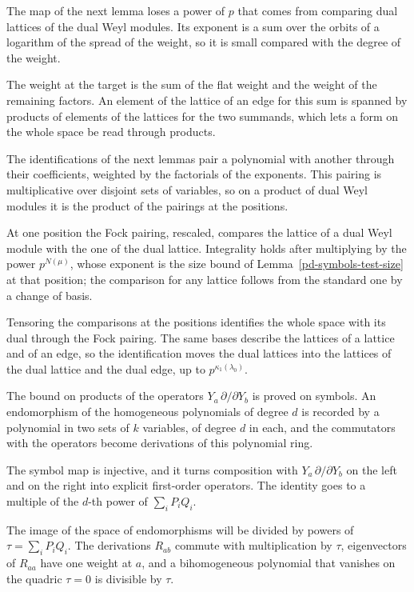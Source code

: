 The map of the next lemma loses a power of $p$ that comes from comparing dual lattices of the dual Weyl
modules. Its exponent is a sum over the orbits of a logarithm of the spread of the weight, so it is
small compared with the degree of the weight.

The weight at the target is the sum of the flat weight and the weight of the remaining factors. An element
of the lattice of an edge for this sum is spanned by products of elements of the lattices for the two
summands, which lets a form on the whole space be read through products.

The identifications of the next lemmas pair a polynomial with another through their coefficients, weighted
by the factorials of the exponents. This pairing is multiplicative over disjoint sets of variables, so on a
product of dual Weyl modules it is the product of the pairings at the positions.

At one position the Fock pairing, rescaled, compares the lattice of a dual Weyl module with the one of the
dual lattice. Integrality holds after multiplying by the power $p^{N(\mu)}$, whose exponent is the size bound
of Lemma~\ref{pd-symbols-test-size} at that position; the comparison for any lattice follows from the
standard one by a change of basis.

Tensoring the comparisons at the positions identifies the whole space with its dual through the Fock
pairing. The same bases describe the lattices of a lattice and of an edge, so the identification moves the
dual lattices into the lattices of the dual lattice and the dual edge, up to $p^{\kappa_1(\lambda_0)}$.

The bound on products of the operators $Y_a\,\partial/\partial Y_b$ is proved on symbols. An endomorphism of the
homogeneous polynomials of degree $d$ is recorded by a polynomial in two sets of $k$ variables, of degree $d$ in each,
and the commutators with the operators become derivations of this polynomial ring.

The symbol map is injective, and it turns composition with $Y_a\,\partial/\partial Y_b$ on the left and on the right into
explicit first-order operators. The identity goes to a multiple of the $d$-th power of $\sum_iP_iQ_i$.

The image of the space of endomorphisms will be divided by powers of $\tau=\sum_iP_iQ_i$. The derivations $R_{ab}$
commute with multiplication by $\tau$, eigenvectors of $R_{aa}$ have one weight at $a$, and a bihomogeneous polynomial
that vanishes on the quadric $\tau=0$ is divisible by $\tau$.

